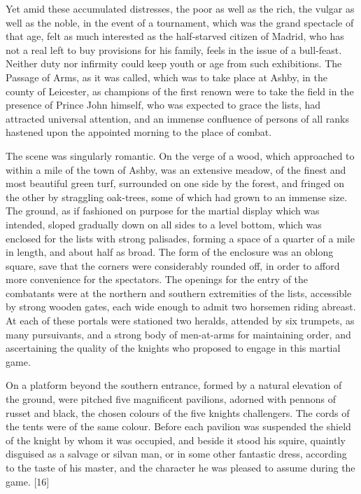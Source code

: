 Yet amid these accumulated distresses, the poor as well as the rich, the
vulgar as well as the noble, in the event of a tournament, which was the
grand spectacle of that age, felt as much interested as the half-starved
citizen of Madrid, who has not a real left to buy provisions for his
family, feels in the issue of a bull-feast. Neither duty nor infirmity
could keep youth or age from such exhibitions. The Passage of Arms, as
it was called, which was to take place at Ashby, in the county of
Leicester, as champions of the first renown were to take the field in
the presence of Prince John himself, who was expected to grace the
lists, had attracted universal attention, and an immense confluence of
persons of all ranks hastened upon the appointed morning to the place of
combat.

The scene was singularly romantic. On the verge of a wood, which
approached to within a mile of the town of Ashby, was an extensive
meadow, of the finest and most beautiful green turf, surrounded on one
side by the forest, and fringed on the other by straggling oak-trees,
some of which had grown to an immense size. The ground, as if fashioned
on purpose for the martial display which was intended, sloped gradually
down on all sides to a level bottom, which was enclosed for the lists
with strong palisades, forming a space of a quarter of a mile in length,
and about half as broad. The form of the enclosure was an oblong square,
save that the corners were considerably rounded off, in order to afford
more convenience for the spectators. The openings for the entry of the
combatants were at the northern and southern extremities of the lists,
accessible by strong wooden gates, each wide enough to admit two
horsemen riding abreast. At each of these portals were stationed two
heralds, attended by six trumpets, as many pursuivants, and a strong
body of men-at-arms for maintaining order, and ascertaining the quality
of the knights who proposed to engage in this martial game.

On a platform beyond the southern entrance, formed by a natural
elevation of the ground, were pitched five magnificent pavilions,
adorned with pennons of russet and black, the chosen colours of the five
knights challengers. The cords of the tents were of the same colour.
Before each pavilion was suspended the shield of the knight by whom it
was occupied, and beside it stood his squire, quaintly disguised as a
salvage or silvan man, or in some other fantastic dress, according to
the taste of his master, and the character he was pleased to assume
during the game. {[}16{]}

